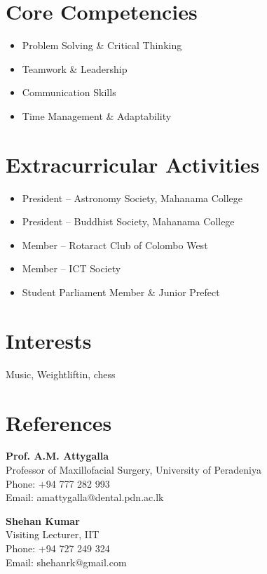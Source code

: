 \documentclass[a4paper,10pt]{article}
\begin{document}
\section*{Core Competencies}

\begin{itemize}
    \item Problem Solving \& Critical Thinking
    \item Teamwork \& Leadership
    \item Communication Skills
    \item Time Management \& Adaptability
\end{itemize}

\section*{Extracurricular Activities}

\begin{itemize}
    \item President – Astronomy Society, Mahanama College
    \item President – Buddhist Society, Mahanama College
    \item Member – Rotaract Club of Colombo West
    \item Member – ICT Society
    \item Student Parliament Member \& Junior Prefect
\end{itemize}

\section*{Interests}
Music, Weightliftin, chess

\section*{References}

\textbf{Prof. A.M. Attygalla} \\
Professor of Maxillofacial Surgery, University of Peradeniya \\
Phone: +94 777 282 993 \\
Email: amattygalla@dental.pdn.ac.lk

\vspace{5pt}

\textbf{Shehan Kumar} \\
Visiting Lecturer, IIT \\
Phone: +94 727 249 324 \\
Email: shehanrk@gmail.com
\end{document}
